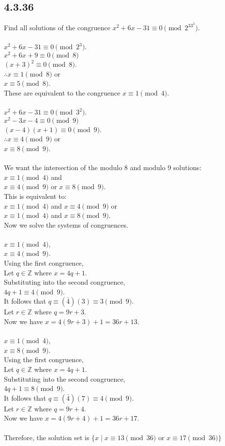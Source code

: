 \documentclass{article}
\begin{document}
\subsection{4.3.36}
Find all solutions of the congruence $x^2+6x-31\equiv0\pmod{2^33^2}$.
\\
\\$x^2+6x-31\equiv0\pmod{2^3}$.
\\$x^2+6x+9\equiv0\pmod{8}$
\\$(x+3)^2\equiv0\pmod{8}$.
\\$\therefore x\equiv1\pmod{8}$ or
\\$x\equiv5\pmod{8}$.
\\These are equivalent to the congruence $x\equiv1\pmod{4}$.
\\
\\$x^2+6x-31\equiv0\pmod{3^2}$.
\\$x^2-3x-4\equiv0\pmod{9}$
\\$(x-4)(x+1)\equiv0\pmod{9}$.
\\$\therefore x\equiv4\pmod{9}$ or
\\$x\equiv8\pmod{9}$.
\\
\\We want the intersection of the modulo 8 and modulo 9 solutions:
\\$x\equiv1\pmod{4}$ and
\\$x\equiv4\pmod{9}$ or $x\equiv8\pmod{9}$.
\\This is equivalent to:
\\$x\equiv1\pmod{4}$ and $x\equiv4\pmod{9}$ or
\\$x\equiv1\pmod{4}$ and $x\equiv8\pmod{9}$.
\\Now we solve the systems of congruences.
\\
\\$x\equiv1\pmod{4}$,
\\$x\equiv4\pmod{9}$.
\\Using the first congruence,
\\Let $q \in \mathbb{Z}$ where $x=4q+1$.
\\Substituting into the second congruence,
\\$4q + 1 \equiv 4 \pmod{9}$.
\\It follows that $q \equiv (\bar{4})(3) \equiv 3 \pmod{9}$.
\\Let $r \in \mathbb{Z}$ where $q=9r+3$.
\\Now we have $x=4(9r+3)+1=36r+13$.
\\
\\$x\equiv1\pmod{4}$,
\\$x\equiv8\pmod{9}$.
\\Using the first congruence,
\\Let $q \in \mathbb{Z}$ where $x=4q+1$.
\\Substituting into the second congruence,
\\$4q + 1 \equiv 8 \pmod{9}$.
\\It follows that $q \equiv (\bar{4})(7) \equiv 4 \pmod{9}$.
\\Let $r \in \mathbb{Z}$ where $q=9r+4$.
\\Now we have $x=4(9r+4)+1=36r+17$.
\\
\\Therefore, the solution set is $\{x \mid x \equiv 13 \pmod{36}$
or $x \equiv 17 \pmod{36}\}$
\end{document}
